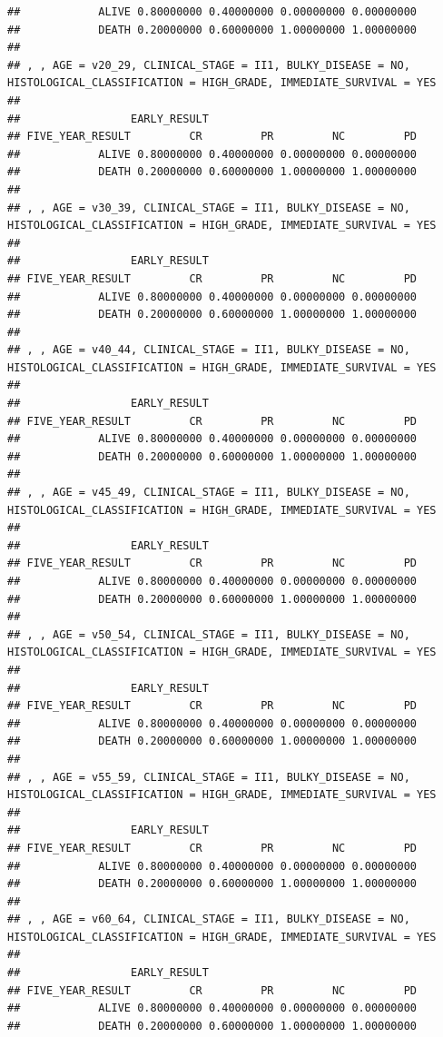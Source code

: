 \documentclass[]{article}
\begin{document}
\begin{verbatim}
##            ALIVE 0.80000000 0.40000000 0.00000000 0.00000000
##            DEATH 0.20000000 0.60000000 1.00000000 1.00000000
## 
## , , AGE = v20_29, CLINICAL_STAGE = II1, BULKY_DISEASE = NO, HISTOLOGICAL_CLASSIFICATION = HIGH_GRADE, IMMEDIATE_SURVIVAL = YES
## 
##                 EARLY_RESULT
## FIVE_YEAR_RESULT         CR         PR         NC         PD
##            ALIVE 0.80000000 0.40000000 0.00000000 0.00000000
##            DEATH 0.20000000 0.60000000 1.00000000 1.00000000
## 
## , , AGE = v30_39, CLINICAL_STAGE = II1, BULKY_DISEASE = NO, HISTOLOGICAL_CLASSIFICATION = HIGH_GRADE, IMMEDIATE_SURVIVAL = YES
## 
##                 EARLY_RESULT
## FIVE_YEAR_RESULT         CR         PR         NC         PD
##            ALIVE 0.80000000 0.40000000 0.00000000 0.00000000
##            DEATH 0.20000000 0.60000000 1.00000000 1.00000000
## 
## , , AGE = v40_44, CLINICAL_STAGE = II1, BULKY_DISEASE = NO, HISTOLOGICAL_CLASSIFICATION = HIGH_GRADE, IMMEDIATE_SURVIVAL = YES
## 
##                 EARLY_RESULT
## FIVE_YEAR_RESULT         CR         PR         NC         PD
##            ALIVE 0.80000000 0.40000000 0.00000000 0.00000000
##            DEATH 0.20000000 0.60000000 1.00000000 1.00000000
## 
## , , AGE = v45_49, CLINICAL_STAGE = II1, BULKY_DISEASE = NO, HISTOLOGICAL_CLASSIFICATION = HIGH_GRADE, IMMEDIATE_SURVIVAL = YES
## 
##                 EARLY_RESULT
## FIVE_YEAR_RESULT         CR         PR         NC         PD
##            ALIVE 0.80000000 0.40000000 0.00000000 0.00000000
##            DEATH 0.20000000 0.60000000 1.00000000 1.00000000
## 
## , , AGE = v50_54, CLINICAL_STAGE = II1, BULKY_DISEASE = NO, HISTOLOGICAL_CLASSIFICATION = HIGH_GRADE, IMMEDIATE_SURVIVAL = YES
## 
##                 EARLY_RESULT
## FIVE_YEAR_RESULT         CR         PR         NC         PD
##            ALIVE 0.80000000 0.40000000 0.00000000 0.00000000
##            DEATH 0.20000000 0.60000000 1.00000000 1.00000000
## 
## , , AGE = v55_59, CLINICAL_STAGE = II1, BULKY_DISEASE = NO, HISTOLOGICAL_CLASSIFICATION = HIGH_GRADE, IMMEDIATE_SURVIVAL = YES
## 
##                 EARLY_RESULT
## FIVE_YEAR_RESULT         CR         PR         NC         PD
##            ALIVE 0.80000000 0.40000000 0.00000000 0.00000000
##            DEATH 0.20000000 0.60000000 1.00000000 1.00000000
## 
## , , AGE = v60_64, CLINICAL_STAGE = II1, BULKY_DISEASE = NO, HISTOLOGICAL_CLASSIFICATION = HIGH_GRADE, IMMEDIATE_SURVIVAL = YES
## 
##                 EARLY_RESULT
## FIVE_YEAR_RESULT         CR         PR         NC         PD
##            ALIVE 0.80000000 0.40000000 0.00000000 0.00000000
##            DEATH 0.20000000 0.60000000 1.00000000 1.00000000

\end{verbatim}
\end{document}
